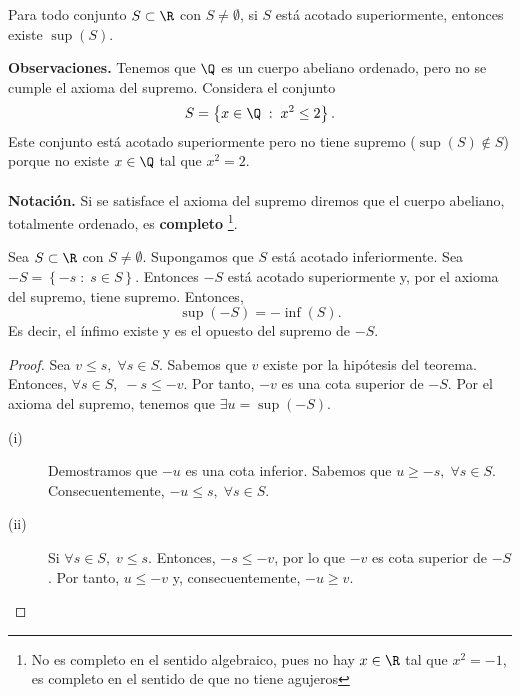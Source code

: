 \begin{faxiom}
\normalfont Para todo conjunto $\displaystyle S \subset \R $ con $\displaystyle S \neq \emptyset $, si $\displaystyle S $ está acotado superiormente, entonces existe $\displaystyle \sup\left(S\right) $.
\end{faxiom}

\textbf{Observaciones.} Tenemos que $\displaystyle \Q $ es un cuerpo abeliano ordenado, pero no se cumple el axioma del supremo. Considera el conjunto 
\[S = \left\{ x \in \Q \; : \; x^{2} \leq 2\right\}  .\]
Este conjunto está acotado superiormente pero no tiene supremo ($\displaystyle \sup\left(S\right)\not\in S $) porque no existe $\displaystyle x \in \Q $ tal que $\displaystyle x^{2} = 2 $. \\ \\
\textbf{Notación.} Si se satisface el axioma del supremo diremos que el cuerpo abeliano, totalmente ordenado, es \textbf{completo} \footnote{No es completo en el sentido algebraico, pues no hay $\displaystyle x \in \R $ tal que $\displaystyle x^{2}=-1 $, es completo en el sentido de que no tiene agujeros}. 

\begin{ftheorem}[]
	\normalfont Sea $\displaystyle S \subset \R $  con $\displaystyle S \neq \emptyset $. Supongamos que $\displaystyle S $ está acotado inferiormente. Sea $\displaystyle - S = \left\{ - s \; : \; s \in S\right\}  $. Entonces $\displaystyle -S $ está acotado superiormente y, por el axioma del supremo, tiene supremo. Entonces, 
	\[\sup\left(-S\right) = - \inf\left(S\right) .\]
Es decir, el ínfimo existe y es el opuesto del supremo de $\displaystyle - S $.
\end{ftheorem}

\begin{proof}
Sea $\displaystyle v \leq s, \; \forall s \in S$. Sabemos que $\displaystyle v $ existe por la hipótesis del teorema. Entonces, $\displaystyle \forall s \in S, \; - s \leq - v $. Por tanto, $\displaystyle - v $ es una cota superior de $\displaystyle -S $. Por el axioma del supremo, tenemos que $\displaystyle \exists u = \sup\left(- S\right) $. 
\begin{description}
\item[(i)] Demostramos que $\displaystyle -u $ es una cota inferior. Sabemos que $\displaystyle u \geq - s, \; \forall s \in S $. Consecuentemente, $\displaystyle - u \leq s, \; \forall s \in S $. 
\item[(ii)] Si $\displaystyle \forall s \in S, \; v \leq s $. Entonces, $\displaystyle -s \leq - v $, por lo que $\displaystyle -v $ es cota superior de $\displaystyle -S $. Por tanto, $\displaystyle u \leq - v $ y, consecuentemente, $\displaystyle - u \geq v $.
\end{description}
\end{proof}

